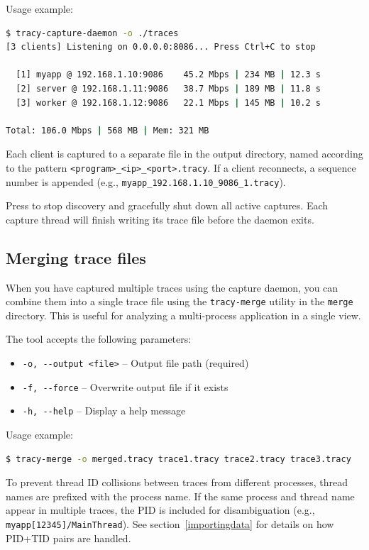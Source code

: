 \documentclass[hidelinks,titlepage,a4paper,twoside]{article}
\begin{document}
Usage example:

\begin{lstlisting}[language=sh]
$ tracy-capture-daemon -o ./traces
[3 clients] Listening on 0.0.0.0:8086... Press Ctrl+C to stop

  [1] myapp @ 192.168.1.10:9086    45.2 Mbps | 234 MB | 12.3 s
  [2] server @ 192.168.1.11:9086   38.7 Mbps | 189 MB | 11.8 s
  [3] worker @ 192.168.1.12:9086   22.1 Mbps | 145 MB | 10.2 s

Total: 106.0 Mbps | 568 MB | Mem: 321 MB
\end{lstlisting}

Each client is captured to a separate file in the output directory, named according to the pattern \texttt{<program>\_<ip>\_<port>.tracy}. If a client reconnects, a sequence number is appended (e.g., \texttt{myapp\_192.168.1.10\_9086\_1.tracy}).

Press  to stop discovery and gracefully shut down all active captures. Each capture thread will finish writing its trace file before the daemon exits.

\subsection{Merging trace files}
\label{mergingtraces}

When you have captured multiple traces using the capture daemon, you can combine them into a single trace file using the \texttt{tracy-merge} utility in the \texttt{merge} directory. This is useful for analyzing a multi-process application in a single view.

The tool accepts the following parameters:

\begin{itemize}
  \item \texttt{-o, -{}-output <file>} -- Output file path (required)
  \item \texttt{-f, -{}-force} -- Overwrite output file if it exists
  \item \texttt{-h, -{}-help} -- Display a help message
\end{itemize}

Usage example:

\begin{lstlisting}[language=sh]
$ tracy-merge -o merged.tracy trace1.tracy trace2.tracy trace3.tracy
\end{lstlisting}

To prevent thread ID collisions between traces from different processes, thread names are prefixed with the process name. If the same process and thread name appear in multiple traces, the PID is included for disambiguation (e.g., \texttt{myapp[12345]/MainThread}). See section~\ref{importingdata} for details on how PID+TID pairs are handled.
\end{document}
